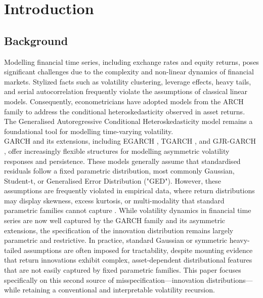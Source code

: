 \documentclass[oneside,12pt]{CUEDthesisPSnPDF}
\newcommand{\textcite}{\citet}
\newcommand{\parencite}{\citep}
\begin{document}

\chapter{Introduction}

\section{Background}
\noindent
Modelling financial time series, including exchange rates and equity returns, poses significant challenges due to the complexity and non-linear dynamics of financial markets. Stylized facts such as volatility clustering, leverage effects, heavy tails, and serial autocorrelation frequently violate the assumptions of classical linear models. Consequently, econometricians have adopted models from the ARCH family to address the conditional heteroskedasticity observed in asset returns. The Generalised Autoregressive Conditional Heteroskedasticity model remains a foundational tool for modelling time-varying volatility.\\

GARCH and its extensions, including EGARCH \parencite{nelson1991conditional}, TGARCH \parencite{zakoian1994threshold}, and GJR-GARCH \parencite{glosten1993relation}, offer increasingly flexible structures for modelling asymmetric volatility responses and persistence. These models generally assume that standardised residuals follow a fixed parametric distribution, most commonly Gaussian, Student-t, or Generalised Error Distribution ("GED"). However, these assumptions are frequently violated in empirical data, where return distributions may display skewness, excess kurtosis, or multi-modality that standard parametric families cannot capture \textcite{ederington2005forecasting}. While volatility dynamics in financial time series are now well captured by the GARCH family and its asymmetric extensions, the specification of the innovation distribution remains largely parametric and restrictive. In practice, standard Gaussian or symmetric heavy-tailed assumptions are often imposed for tractability, despite mounting evidence that return innovations exhibit complex, asset-dependent distributional features that are not easily captured by fixed parametric families. This paper focuses specifically on this second source of misspecification—innovation distributions—while retaining a conventional and interpretable volatility recursion.\\
\end{document}
